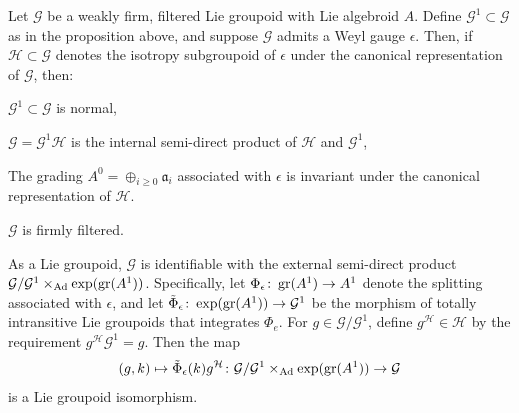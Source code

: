 \documentclass[leqno,12pt]{amsart} %
\begin{document}
\begin{theorem}
  Let ${\mathcal G} $ be a weakly firm, filtered Lie groupoid with Lie algebroid
  $A$. Define ${\mathcal G}^1 \subset {\mathcal G} $ as in the proposition above, and
  suppose ${\mathcal G} $ admits a Weyl gauge $\epsilon$.  Then, if
  ${\mathcal H} \subset {\mathcal G} $ denotes the isotropy subgroupoid of $\epsilon$ under the
  canonical representation of ${\mathcal G} $, then:
  \begin{conditions}
  \item ${\mathcal G}^1 \subset {\mathcal G} $ is normal,\label{pr1}
  \item ${\mathcal G}={\mathcal G}^1{\mathcal H} $ is the internal semi-direct product of ${\mathcal H} $ and
    ${\mathcal G}^1$,\label{pr2}
  \item The grading $A^0=\oplus_{i\ge0}{\mathfrak a}_i$ associated with $\epsilon$ is
    invariant under the canonical representation of ${\mathcal H}$. \label{pr3}
  \item ${\mathcal G} $ is firmly filtered.\label{pr4}
  \item As a Lie groupoid, ${\mathcal G} $ is identifiable with the external semi-direct
    product ${\mathcal G}/{\mathcal G}^1
    \times_{\operatorname{Ad}}\exp(\operatorname{\operatorname{gr}}(A^1))$. Specifically, let
    $\Phi_\epsilon \colon \operatorname{\operatorname{gr}}(A^1) \rightarrow A^1$ denote the splitting associated with
    $\epsilon$, and let $\tilde \Phi_\epsilon \colon \exp(\operatorname{\operatorname{gr}}(A^1)) \rightarrow {\mathcal G}^1$ be
    the morphism of totally intransitive Lie groupoids that integrates $\Phi_e$.  For
    $g \in {\mathcal G}/{\mathcal G}^1$, define $g^{\mathcal H} \in {\mathcal H} $ by the
    requirement $g^{\mathcal H} {\mathcal G}^1 = g$.  Then the map
    $$(g, k) \mapsto \tilde \Phi_\epsilon(k) g^{\mathcal H} \colon {\mathcal G}/{\mathcal G}^1
    \times_{\operatorname{Ad}}\exp(\operatorname{\operatorname{gr}}(A^1)) \rightarrow {\mathcal G}$$ is a Lie groupoid
    isomorphism.\label{pr5}
  \end{conditions}
\end{theorem}
\end{document}
